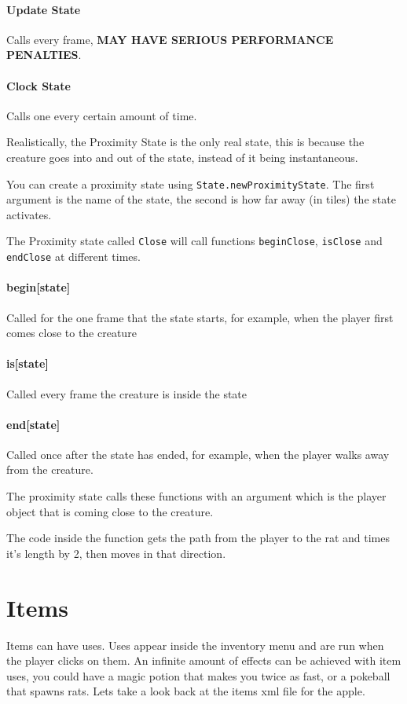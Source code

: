 \documentclass{book}
\begin{document}
\paragraph{Update State} Calls every frame, \textbf{MAY HAVE SERIOUS PERFORMANCE PENALTIES}.

\paragraph{Clock State} Calls one every certain amount of time.

Realistically, the Proximity State is the only real state, this is because the creature goes into and out of the state, instead of it being instantaneous.

You can create a proximity state using \texttt{State.newProximityState}. The first argument is the name of the state, the second is how far away (in tiles) the state activates.

The Proximity state called \texttt{Close} will call functions \texttt{beginClose}, \texttt{isClose} and \texttt{endClose} at different times.

\paragraph{begin[state]} Called for the one frame that the state starts, for example, when the player first comes close to the creature

\paragraph{is[state]} Called every frame the creature is inside the state

\paragraph{end[state]} Called once after the state has ended, for example, when the player walks away from the creature.

The proximity state calls these functions with an argument which is the player object that is coming close to the creature.

The code inside the function gets the path from the player to the rat and times it's length by 2, then moves in that direction.


\section{Items}
Items can have uses. Uses appear inside the inventory menu and are run when the player clicks on them. An infinite amount of effects can be achieved with item uses, you could have a magic potion that makes you twice as fast, or a pokeball that spawns rats. Lets take a look back at the items xml file for the apple.
\end{document}
